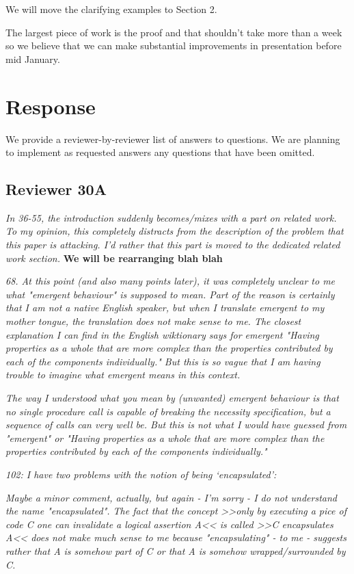 \documentclass[11pt]{amsart}
\newcommand{\rev}[1]{\emph #1}
\newcommand{\us}[1]{\bf #1}
\begin{document}
We will move the clarifying examples to Section 2.

The largest piece of work is the proof and that shouldn't take more than a week so we believe that we can make substantial improvements in presentation before mid January.

  
\section{Response} We provide a reviewer-by-reviewer list of answers to questions. We are planning to implement as requested answers any questions that have been omitted.
  
  \subsection*{Reviewer 30A}
  
{\rev {{In 36-55, the introduction suddenly becomes/mixes with a part on related work. To my opinion, this completely distracts from the description of the problem that this paper is attacking. I'd rather that this part is moved to the dedicated related work section.}}}
{\us{{We will be rearranging blah blah}}}

{\rev {{ 68. At this point (and also many points later), it was completely unclear to me what "emergent behaviour" is supposed to mean. Part of the reason is certainly that I am not a native English speaker, but when I translate emergent to my mother tongue, the translation does not make sense to me. The closest explanation I can find in the English wiktionary says for emergent "Having properties as a whole that are more complex than the properties contributed by each of the components individually." But this is so vague that I am having trouble to imagine what emergent means in this context.}}}

{\rev {{    The way I understood what you mean by (unwanted) emergent behaviour is that no single procedure call is capable of breaking the necessity specification, but a sequence of calls can very well be. But this is not what I would have guessed from "emergent" or "Having properties as a whole that are more complex than the properties contributed by each of the components individually." }}}

{\rev {{102: I have two problems with the notion of being  `encapsulated': }}}

{\rev {{ Maybe a minor comment, actually, but again - I'm sorry - I do not understand the name "encapsulated". The fact that the concept >>only by executing a pice of code C one can invalidate a logical assertion A<< is called >>C encapsulates A<< does not make much sense to me because "encapsulating" - to me - suggests rather that A is somehow part of C or that A is somehow wrapped/surrounded by C. }}}
\end{document}
